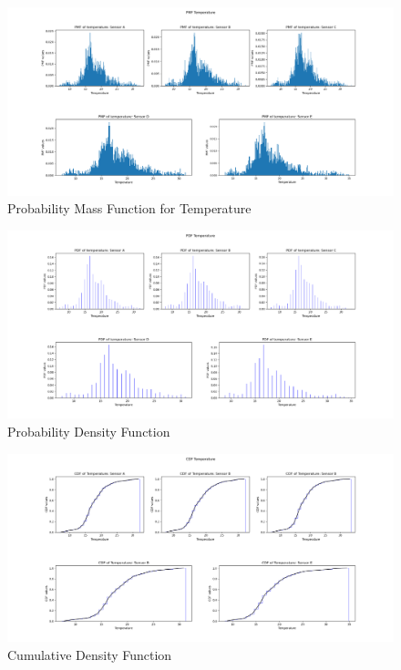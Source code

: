 \documentclass[a4paper]{article}
\begin{document}
            \begin{figure}[H]
            \centering
                \includegraphics[width=\textwidth]{images/PMF_Temperature_5_sensors.png}
                \caption{Probability Mass Function for Temperature}
                \label{fig:Sensors's PMF}
            \end{figure}

            \begin{figure}[H]
            \centering
                \includegraphics[width=\textwidth]{images/PDF_Temperature_5_sensors.png}
                \caption{Probability Density Function}
                \label{fig:Sensors's PDF}
            \end{figure}

            \begin{figure}[H]
            \centering
                \includegraphics[width=\textwidth]{images/CDF_Temperature_5_sensors.png}
                \caption{Cumulative Density Function}
                \label{fig:Sensor's CDF}
            \end{figure}
\end{document}
